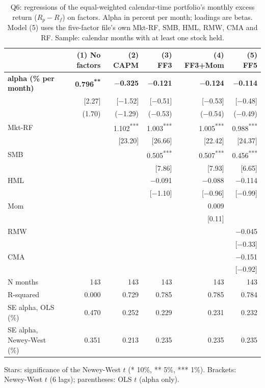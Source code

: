\begin{table}[!htbp]
\centering
\small
\caption{Q6: regressions of the equal-weighted calendar-time portfolio's monthly excess return ($R_p - R_f$) on factors. Alpha in percent per month; loadings are betas. Model (5) uses the five-factor file's own Mkt-RF, SMB, HML, RMW, CMA and RF. Sample: calendar months with at least one stock held.}
\label{tab:q6}
\begin{tabular}{lrrrrr}
\toprule
 & (1) No factors & (2) CAPM & (3) FF3 & (4) FF3+Mom & (5) FF5 \\
\midrule
\rowcolor[gray]{0.94} \textbf{alpha (\% per month)} & \textbf{0.796\textsuperscript{**}} & \textbf{$-$0.325} & \textbf{$-$0.121} & \textbf{$-$0.124} & \textbf{$-$0.114} \\
\rowcolor[gray]{0.94}  & [2.27] & [$-$1.52] & [$-$0.51] & [$-$0.53] & [$-$0.48] \\
\rowcolor[gray]{0.94}  & (1.70) & ($-$1.29) & ($-$0.53) & ($-$0.54) & ($-$0.49) \\
\addlinespace
Mkt-RF &  & 1.102\textsuperscript{***} & 1.003\textsuperscript{***} & 1.005\textsuperscript{***} & 0.988\textsuperscript{***} \\
 &  & [23.20] & [26.66] & [22.42] & [24.37] \\
\addlinespace
SMB &  &  & 0.505\textsuperscript{***} & 0.507\textsuperscript{***} & 0.456\textsuperscript{***} \\
 &  &  & [7.86] & [7.93] & [6.65] \\
\addlinespace
HML &  &  & $-$0.091 & $-$0.088 & $-$0.114 \\
 &  &  & [$-$1.10] & [$-$0.96] & [$-$0.99] \\
\addlinespace
Mom &  &  &  & 0.009 &  \\
 &  &  &  & [0.11] &  \\
\addlinespace
RMW &  &  &  &  & $-$0.045 \\
 &  &  &  &  & [$-$0.33] \\
\addlinespace
CMA &  &  &  &  & $-$0.151 \\
 &  &  &  &  & [$-$0.92] \\
\midrule
N months & 143 & 143 & 143 & 143 & 143 \\
R-squared & 0.000 & 0.729 & 0.785 & 0.785 & 0.784 \\
SE alpha, OLS (\%) & 0.470 & 0.252 & 0.229 & 0.231 & 0.232 \\
SE alpha, Newey-West (\%) & 0.351 & 0.213 & 0.235 & 0.235 & 0.235 \\
\bottomrule
\end{tabular}
\par\vspace{3pt}
{\footnotesize Stars: significance of the Newey-West $t$ (* 10\%, ** 5\%, *** 1\%). Brackets: Newey-West $t$ (6 lags); parentheses: OLS $t$ (alpha only).}
\end{table}
